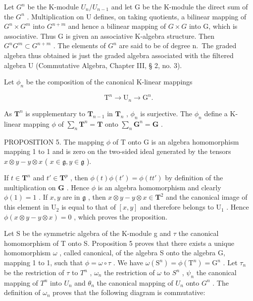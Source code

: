 Let \(G^n\) be the K-module \(U_n / U_{n-1}\) and let G be the K-module the direct sum of the \(G^n\) . Multiplication on U defines, on taking quotients, a bilinear mapping of \(G^n \times G^m\) into \(G^{n+m}\) and hence a bilinear mapping of \(G \times G\) into G, which is associative. Thus G is given an associative K-algebra structure. Then \(G^n G^m \subset G^{n+m}\) . The elements of \(G^n\) are said to be of degree n.~The graded algebra thus obtained is just the graded algebra associated with the filtered algebra U (Commutative Algebra, Chapter III, § 2, no. 3).

Let \(\phi_{n}\) be the composition of the canonical K-linear mappings

\[
\mathrm{T} ^ {n} \rightarrow \mathrm{U} _ {n} \rightarrow \mathrm{G} ^ {n}.
\]

As \(\mathbf{T}^n\) is supplementary to \(\mathbf{T}_{n - 1}\) in \(\mathbf{T}_n\) , \(\phi_n\) is surjective. The \(\phi_n\) define a K-linear mapping \(\phi\) of \(\sum_{n}\mathbf{T}^{n} = \mathbf{T}\) onto \(\sum_{n}\mathbf{G}^{n} = \mathbf{G}\) .

PROPOSITION 5. The mapping \(\phi\) of T onto G is an algebra homomorphism mapping 1 to 1 and is zero on the two-sided ideal generated by the tensors \(x \otimes y - y \otimes x\) ( \(x \in \mathfrak{g}, y \in \mathfrak{g}\) ).

If \(t \in \mathbf{T}^n\) and \(t' \in \mathbf{T}^p\) , then \(\phi(t)\phi(t') = \phi(tt')\) by definition of the multiplication on \(\mathbf{G}\) . Hence \(\phi\) is an algebra homomorphism and clearly \(\phi(1) = 1\) . If \(x, y\) are in \(\mathfrak{g}\) , then \(x \otimes y - y \otimes x \in \mathbf{T}^2\) and the canonical image of this element in \(\mathrm{U}_2\) is equal to that of \([x, y]\) and therefore belongs to \(\mathrm{U}_1\) . Hence \(\phi(x \otimes y - y \otimes x) = 0\) , which proves the proposition.

Let S be the symmetric algebra of the K-module g and \(\tau\) the canonical homomorphism of T onto S. Proposition 5 proves that there exists a unique homomorphism \(\omega\) , called canonical, of the algebra S onto the algebra G, mapping 1 to 1, such that \(\phi = \omega \circ \tau\) . We have \(\omega(\mathrm{S}^{n}) = \phi(\mathrm{T}^{n}) = \mathrm{G}^{n}\) . Let \(\tau_{n}\) be the restriction of \(\tau\) to \(T^{n}\) , \(\omega_{n}\) the restriction of \(\omega\) to \(S^{n}\) , \(\psi_{n}\) the canonical mapping of \(T^{n}\) into \(U_{n}\) and \(\theta_{n}\) the canonical mapping of \(U_{n}\) onto \(G^{n}\) . The definition of \(\omega_{n}\) proves that the following diagram is commutative:

